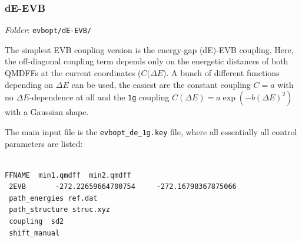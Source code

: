 \documentclass[12pt,a4paper]{scrartcl}
\begin{document}
\subsubsection{dE-EVB}

\textit{Folder}: \texttt{evbopt/dE-EVB/} \newline

The simplest EVB coupling version is the energy-gap (dE)-EVB coupling.
Here, the off-diagonal coupling term depends only on the energetic distances of both
QMDFFs at the current coordinates ($C(\Delta E$).
A bunch of different functions depending on $\Delta E$ can be used, the easiest are
the constant coupling $C=a$ with no $\Delta E$-dependence at all and the \texttt{1g} 
coupling $C(\Delta E)=a \exp\left(-b (\Delta E)^2\right)$ with a Gaussian shape.

The main input file is the \texttt{evbopt\_de\_1g.key} file, where all essentially all
control parameters are listed:

\begin{verbatim}

FFNAME  min1.qmdff  min2.qmdff
 2EVB       -272.22659664700754     -272.16798367875066
 path_energies ref.dat
 path_structure struc.xyz
 coupling  sd2
 shift_manual
\end{verbatim}
\end{document}
